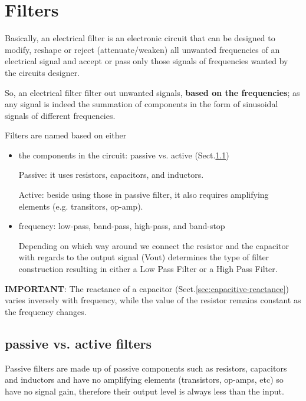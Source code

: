 \section{Filters}
\label{sec:filter-electrical}

Basically, an electrical filter is an electronic circuit that can be designed to
modify, reshape or reject (attenuate/weaken) all unwanted frequencies of an
electrical signal and accept or pass only those signals of frequencies wanted by
the circuits designer.

So, an electrical filter filter out unwanted signals, {\bf based on the
frequencies}; as any signal is indeed the summation of components in the form of
sinusoidal signals of different frequencies.

Filters are named based on either
\begin{itemize}
  \item the components in the circuit: passive vs. active (Sect.\ref{sec:passive-filter})

Passive: it uses resistors, capacitors, and inductors.

Active: beside using those in passive filter, it also requires amplifying
elements (e.g. transitors, op-amp).

  \item frequency: low-pass, band-pass, high-pass, and band-stop

Depending on which way around we connect the resistor and the capacitor with
regards to the output signal (Vout) determines the type of filter construction
resulting in either a Low Pass Filter or a High Pass Filter.

\end{itemize}

{\bf IMPORTANT}: The reactance of a capacitor
(Sect.\ref{sec:capacitive-reactance}) varies inversely with frequency, while the
value of the resistor remains constant as the frequency changes.



\subsection{passive vs. active filters}
\label{sec:passive-filter}
\label{sec:active-filter}

Passive filters are made up of passive components such as resistors, capacitors
and inductors and have no amplifying elements (transistors, op-amps, etc) so
have no signal gain, therefore their output level is always less than the input.

